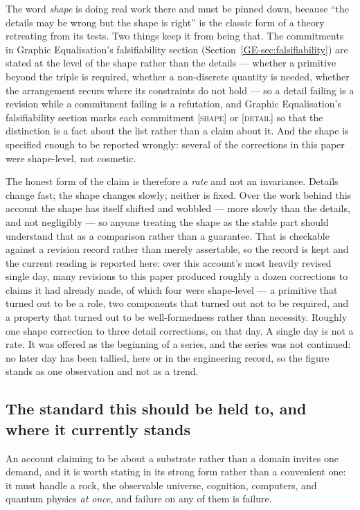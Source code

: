 \documentclass[11pt,a4paper]{article}
\begin{document}
The word \emph{shape} is doing real work there and must be pinned down, because ``the details may be
wrong but the shape is right'' is the classic form of a theory retreating from its tests. Two things
keep it from being that. The commitments in Graphic Equalisation's falsifiability section
(Section~\ref{GE-sec:falsifiability}) are stated at the level
of the shape rather than the details --- whether a primitive beyond the triple is required, whether a
non-discrete quantity is needed, whether the arrangement recurs where its constraints do not hold ---
so a detail failing is a revision while a commitment failing is a refutation, and
Graphic Equalisation's falsifiability section marks each commitment \textsc{[shape]} or
\textsc{[detail]} so that
the distinction is a fact about the list rather than a claim about it. And the shape is specified enough to be reported wrongly: several of the corrections in
this paper were shape-level, not cosmetic.

The honest form of the claim is therefore a \emph{rate} and not an invariance. Details change fast;
the shape changes slowly; neither is fixed. Over the work behind this account the shape has itself
shifted and wobbled --- more slowly than the details, and not negligibly --- so anyone treating the
shape as the stable part should understand that as a comparison rather than a guarantee. That is checkable against a revision record rather than
merely assertable, so the record is kept and the current reading is reported here: over this
account's most heavily revised single day, many revisions to this paper produced roughly a
dozen corrections to claims it had already made, of which four were shape-level --- a primitive that
turned out to be a role, two components that turned out not to be required, and a property that
turned out to be well-formedness rather than necessity. Roughly one shape correction to three detail
corrections, on that day. A single day is not a rate. It was offered as the beginning of a series,
and the series was not continued: no later day has been tallied, here or in the engineering record,
so the figure stands as one observation and not as a trend.

\subsection{The standard this should be held to, and where it currently stands}\label{sec:standard}

An account claiming to be about a substrate rather than a domain invites one demand, and it is worth
stating in its strong form rather than a convenient one: it must handle a rock, the observable
universe, cognition, computers, and quantum physics \emph{at once}, and failure on any of them is
failure.
\end{document}
